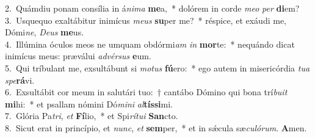 {2.~}Quámdiu ponam consília in á\textit{ni}\textit{ma} \textbf{me}a,~* dolórem in corde \textit{me}\textit{o} \textit{per} \textbf{di}em?\\
{3.~}Usquequo exaltábitur inimícus \textit{me}\textit{us} \textbf{su}per me?~* réspice, et exáudi me, Dómi\textit{ne}, \textit{De}\textit{us} \textbf{me}us.\\
{4.~}Illúmina óculos meos ne umquam obdórmi\textit{am} \textit{in} \textbf{mor}te:~* nequándo dicat inimícus meus: præválui \textit{ad}\textit{vér}\textit{sus} \textbf{e}um.\\
{5.~}Qui tríbulant me, exsultábunt si \textit{mo}\textit{tus} \textbf{fú}ero:~* ego autem in misericórdia \textit{tu}\textit{a} \textit{spe}\textbf{rá}vi.\\
{6.~}Exsultábit cor meum in salutári tuo:~† cantábo Dómino qui bona trí\textit{bu}\textit{it} \textbf{mi}hi:~* et psallam nómini Dó\textit{mi}\textit{ni} \textit{al}\textbf{tís}\textbf{si}mi.\\
{7.~}Glória Pa\textit{tri}, \textit{et} \textbf{Fí}lio,~* et Spi\textit{rí}\textit{tu}\textit{i} \textbf{San}cto.\\
{8.~}Sicut erat in princípio, et \textit{nunc}, \textit{et} \textbf{sem}per,~* et in sǽcula sæ\textit{cu}\textit{ló}\textit{rum}. \textbf{A}men.\\
